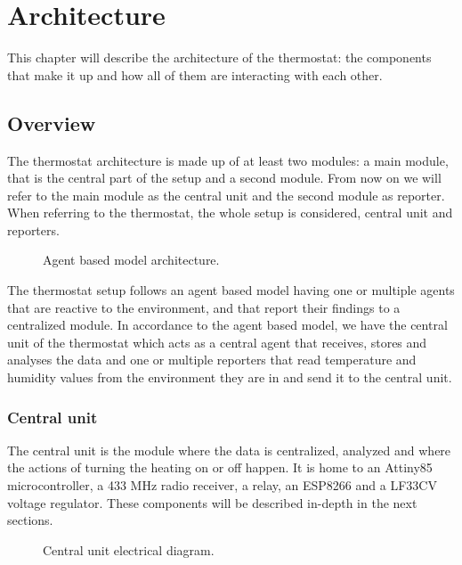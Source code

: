 \chapter{Architecture}
\label{chap:architecture}

This chapter will describe the architecture of the thermostat: the components that make it up and how
all of them are interacting with each other.

\section{Overview}

The thermostat architecture is made up of at least two modules: a main module, that is the central part of the
setup and a second module. From now on we will refer to the main module as the central unit and the second
module as reporter. When referring to the thermostat, the whole setup is considered, central unit and
reporters.

\begin{figure}[h!]
    \label{fig:general_architecture}
    \centerline{}
    \caption[Architecture Diagram]{Agent based model architecture.}
    \label{fig:general_architecture}
\end{figure}

The thermostat setup follows an agent based model having one or multiple agents that are reactive to the
environment, and that report their findings to a centralized module.
In accordance to the agent based model, we have the central unit of the thermostat which acts as a central
agent that receives, stores and analyses the data and one or multiple reporters that read temperature and
humidity values from the environment they are in and send it to the central unit.



\subsection{Central unit}

The central unit is the module where the data is centralized, analyzed and where the actions of turning the
heating on or off happen.
It is home to an Attiny85 microcontroller, a 433 MHz radio receiver, a relay, an ESP8266 and a LF33CV voltage
regulator. These components will be described in-depth in the next sections.

\begin{figure}[h!]
    \label{fig:central_unit_diag}
    \centerline{}
    \caption[Central Unit Electrical Diagram]{Central unit electrical diagram.}
    \label{fig:central_unit_diag}
\end{figure}

